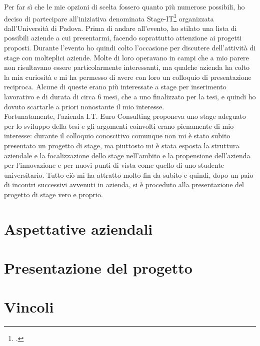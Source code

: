 Per far sì che le mie opzioni di scelta fossero quanto più numerose possibili, ho deciso di partecipare all'iniziativa denominata Stage-IT\footcite{http://informatica.math.unipd.it/laurea/stageit.html} organizzata dall'Università di Padova. Prima di andare all'evento, ho stilato una lista di possibili aziende a cui presentarmi, facendo soprattutto attenzione ai progetti proposti. Durante l'evento ho quindi colto l'occasione per discutere dell'attività di stage con molteplici aziende. Molte di loro operavano in campi che a mio parere non risultavano essere particolarmente interessanti, ma qualche azienda ha colto la mia curiosità e mi ha permesso di avere con loro un colloquio di presentazione reciproca. Alcune di queste erano più interessate a stage per inserimento lavorativo e di durata di circa 6 mesi, che a uno finalizzato per la tesi, e quindi ho dovuto scartarle a priori nonostante il mio interesse. \\
Fortunatamente, l'azienda I.T. Euro Consulting proponeva uno stage adeguato per lo sviluppo della tesi e gli argomenti coinvolti erano pienamente di mio interesse: durante il colloquio conoscitivo comunque non mi è stato subito presentato un progetto di stage, ma piuttosto mi è stata esposta la struttura aziendale e la focalizzazione dello stage nell'ambito  e la propensione dell'azienda per l'innovazione e per nuovi punti di vista come quello di uno studente universitario. Tutto ciò mi ha attratto molto fin da subito e quindi, dopo un paio di incontri successivi avvenuti in azienda, si è proceduto alla presentazione del progetto di stage vero e proprio.

\section{Aspettative aziendali}

\section{Presentazione del progetto}

\section{Vincoli}